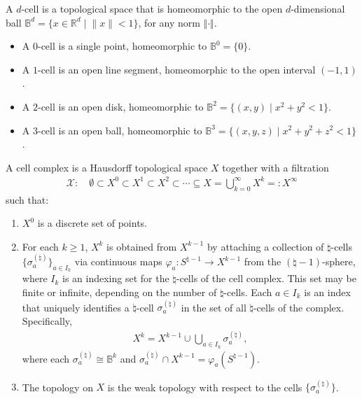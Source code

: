 \begin{definition}[\(d\)-cell]
A \(d\)-cell is a topological space that is homeomorphic to the open \(d\)-dimensional ball $\mathbb{B}^d = \{ x \in \mathbb{R}^d \; \vert \; \|x\| < 1 \}$, for any norm $\Vert \cdot \Vert$.
\end{definition}

\begin{example}\noindent
\begin{itemize}
    \item A $0$-cell is a single point, homeomorphic to \(\mathbb{B}^0 = \{ 0 \}\).
    \item A $1$-cell is an open line segment, homeomorphic to the open interval \((-1, 1)\).
    \item A $2$-cell is an open disk, homeomorphic to \(\mathbb{B}^2 = \{ (x, y) \; \vert \; x^2 + y^2 < 1 \}\).
    \item A $3$-cell is an open ball, homeomorphic to \(\mathbb{B}^3 = \{ (x, y, z) \; \vert \; x^2 + y^2 + z^2 < 1 \}\).
\end{itemize}
\end{example}

\begin{definition}
A cell complex is a Hausdorff topological space \(X\) together with a filtration
\begin{align}
\mathcal{X}: \quad \emptyset \subset X^0 \subset X^1 \subset X^2 \subset \cdots \subseteq X = \bigcup_{k=0}^{\infty} X^k =: X^\infty
\end{align}
such that:
\begin{enumerate}
    \item \(X^0\) is a discrete set of points.
    \item For each \(k \geq 1\), \(X^k\) is obtained from \(X^{k-1}\) by attaching a collection of \(\natural\)-cells \(\{\sigma^{(\natural)}_a\}_{a \in I_k}\) via continuous maps \(\varphi_a : S^{\natural-1} \to X^{k-1}\) from the $(\natural-1)$-sphere, where \(I_k\) is an indexing set for the \(\natural\)-cells of the cell complex. This set may be finite or infinite, depending on the number of \(\natural\)-cells. Each \(a \in I_k\) is an index that uniquely identifies a \(\natural\)-cell \(\sigma^{(\natural)}_a\) in the set of all \(\natural\)-cells of the complex. Specifically,
\begin{align}
    X^k = X^{k-1} \cup \bigcup_{a \in I_k} \sigma^{(\natural)}_a,
\end{align}
    where each \(\sigma^{(\natural)}_a \cong \mathbb{B}^k\) and \(\sigma^{(\natural)}_a \cap X^{k-1} = \varphi_a(S^{\natural-1})\).
    \item The topology on \(X\) is the weak topology with respect to the cells \(\{\sigma^{(\natural)}_a\}\).
\end{enumerate}
\end{definition}

